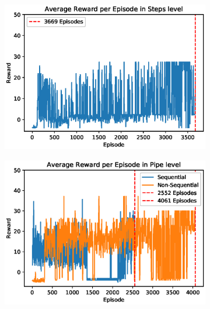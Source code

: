 \documentclass[notitlepage,a4paper,11pt]{article}
\begin{document}
\begin{figure}[htb!]
     \centering
     \begin{subfigure}[t]{0.32\textwidth}
         \centering
         \includegraphics[width=\textwidth]{figs/oc_results_1.eps}
         \caption{}
         \label{fig:oc_results_1}
     \end{subfigure}
     \hfill
     \begin{subfigure}[t]{0.32\textwidth}
         \centering
         \includegraphics[width=\textwidth]{figs/oc_results_2.eps}
         \caption{}
         \label{fig:oc_results_2}
     \end{subfigure}
     \hfill
     \begin{subfigure}[t]{0.32\textwidth}
         \centering

\end{subfigure}
\end{figure}
\end{document}
